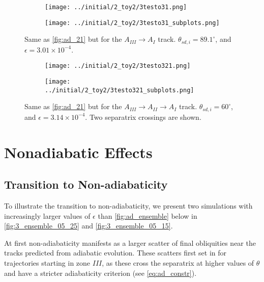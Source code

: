 \documentclass[
        fleqn,
        usenatbib,
    ]{mnras}
\begin{document}
\begin{figure}
    \centering
    \begin{subfigure}{\columnwidth}
        \centering
        \texttt{[image: ../initial/2\_toy2/3testo31.png]}
    \end{subfigure}
    \begin{subfigure}{\columnwidth}
        \centering
        \texttt{[image: ../initial/2\_toy2/3testo31\_subplots.png]}
    \end{subfigure}
    \caption{Same as \autoref{fig:ad_21} but for the $A_{III} \to A_I$
    track. $\theta_{sd, i} = 89.1^\circ$, and $\epsilon = 3.01 \times
    10^{-4}$.}\label{fig:ad_31}
\end{figure}
\begin{figure}
    \centering
    \begin{subfigure}{\columnwidth}
        \centering
        \texttt{[image: ../initial/2\_toy2/3testo321.png]}
    \end{subfigure}
    \begin{subfigure}{\columnwidth}
        \centering
        \texttt{[image: ../initial/2\_toy2/3testo321\_subplots.png]}
    \end{subfigure}
    \caption{Same as \autoref{fig:ad_21} but for the $A_{III} \to A_{II} \to A_I$
    track. $\theta_{sd, i} = 60^\circ$, and $\epsilon = 3.14 \times 10^{-4}$.
    Two separatrix crossings are shown.}\label{fig:ad_321}
\end{figure}

\section{Nonadiabatic Effects}\label{s:nonad}

\subsection{Transition to Non-adiabaticity}

To illustrate the transition to non-adiabaticity, we present two simulations
with increasingly larger values of $\epsilon$ than \autoref{fig:ad_ensemble}
below in \autoref{fig:3_ensemble_05_25} and \autoref{fig:3_ensemble_05_15}.

At first non-adiabaticity manifests as a larger scatter of final obliquities
near the tracks predicted from adiabatic evolution. These scatters first set in
for trajectories starting in zone $III$, as these cross the separatrix at higher
values of $\theta$ and have a stricter adiabaticity criterion (see
\autoref{eq:ad_constr}).
\end{document}

